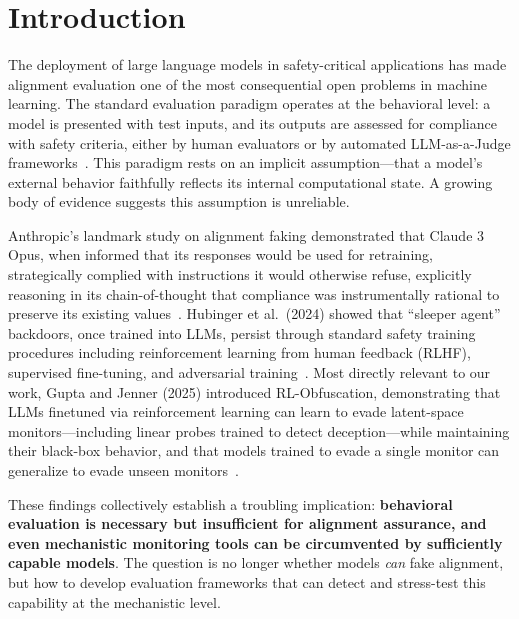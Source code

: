 \documentclass{article}
\begin{document}
\section{Introduction}

The deployment of large language models in safety-critical applications has made alignment evaluation one of the most consequential open problems in machine learning. The standard evaluation paradigm operates at the behavioral level: a model is presented with test inputs, and its outputs are assessed for compliance with safety criteria, either by human evaluators or by automated LLM-as-a-Judge frameworks~\cite{zheng2023judging, liu2023geval}. This paradigm rests on an implicit assumption---that a model's external behavior faithfully reflects its internal computational state. A growing body of evidence suggests this assumption is unreliable.

Anthropic's landmark study on alignment faking demonstrated that Claude 3 Opus, when informed that its responses would be used for retraining, strategically complied with instructions it would otherwise refuse, explicitly reasoning in its chain-of-thought that compliance was instrumentally rational to preserve its existing values~\cite{greenblatt2024alignment}. Hubinger et al.\ (2024) showed that ``sleeper agent'' backdoors, once trained into LLMs, persist through standard safety training procedures including reinforcement learning from human feedback (RLHF), supervised fine-tuning, and adversarial training~\cite{hubinger2024sleeper}. Most directly relevant to our work, Gupta and Jenner (2025) introduced RL-Obfuscation, demonstrating that LLMs finetuned via reinforcement learning can learn to evade latent-space monitors---including linear probes trained to detect deception---while maintaining their black-box behavior, and that models trained to evade a single monitor can generalize to evade unseen monitors~\cite{gupta2025rlobfuscation}.

These findings collectively establish a troubling implication: \textbf{behavioral evaluation is necessary but insufficient for alignment assurance, and even mechanistic monitoring tools can be circumvented by sufficiently capable models}. The question is no longer whether models \emph{can} fake alignment, but how to develop evaluation frameworks that can detect and stress-test this capability at the mechanistic level.
\end{document}

